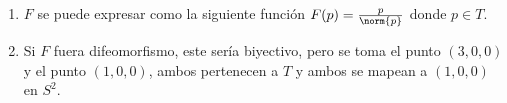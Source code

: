 \documentclass{homework}
\begin{document}
\begin{sol}
    \begin{enumerate}
        \item \(F\) se puede expresar como la siguiente función \(F(p)=\frac{p}{\norm{p}}\) donde \(p\in T\). 
        \item Si \(F\) fuera difeomorfismo, este sería biyectivo, pero se toma el punto \((3,0,0)\) y el punto \((1,0,0)\), ambos pertenecen a \(T\) y ambos se mapean a \((1,0,0)\) en \(S^2\).
    \end{enumerate}
\end{sol}
\end{document}
